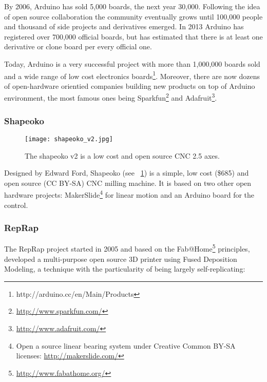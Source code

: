 By 2006, Arduino has sold 5,000 boards, the next year 30,000. Following the idea of open source collaboration the community eventually grows until 100,000 people and thousand of side projects and derivatives emerged. In 2013 Arduino has registered over 700,000 official boards, but has estimated that there is at least one derivative or clone board per every official one.

Today, Arduino is a very successful project with more than 1,000,000 boards sold and a wide range of low cost electronics boards\footnote{http://arduino.cc/en/Main/Products}. Moreover, there are now dozens of open-hardware orientied companies building new products on top of Arduino environment, the most famous ones being Sparkfun\footnote{\url{http://www.sparkfun.com/}} and Adafruit\footnote{\url{http://www.adafruit.com/}}.

\subsubsection{Shapeoko}

\begin{figure}[!ht]
    \begin{center}
        \texttt{[image: shapeoko\_v2.jpg]}
    \end{center}
    \caption{The shapeoko v2 is a low cost and open source CNC 2.5 axes.}
    \label{fig:shapeoko}
\end{figure}

Designed by Edward Ford, Shapeoko (see \figurename~\ref{fig:shapeoko}) is a simple, low cost (\$685) and open source (CC BY-SA) CNC milling machine. It is based on two other open hardware projects: MakerSlide\footnote{Open a source linear bearing system under Creative Common BY-SA licenses: \url{http://makerslide.com/}} for linear motion and an Arduino board for the control.



\subsubsection{RepRap} %

The RepRap project started in 2005 and based on the Fab@Home\footnote{\url{http://www.fabathome.org/}} principles, developed a multi-purpose open source 3D printer using Fused Deposition Modeling, a technique with the particularity of being largely self-replicating:

